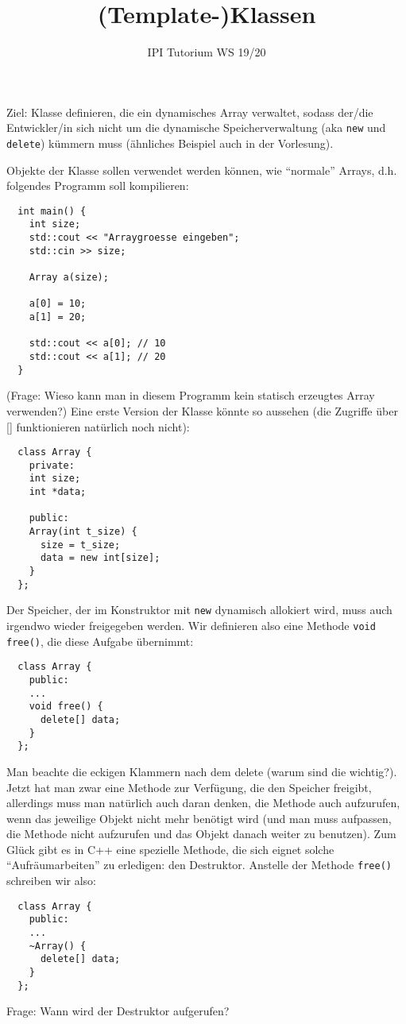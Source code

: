 \documentclass[
fontsize = 11pt,
paper    = a4,
BCOR     = 5mm,
DIV      = 12,
numbers  = noenddot,
]{scrartcl}
\title{(Template-)Klassen}
\author{IPI Tutorium WS 19/20}
\date{}
\def\MMS{\marginpar{%
    \vspace{-1.5em}%
    \begin{mdframed}[style=mms]%
~~???%
\end{mdframed}}}
\begin{document}
\maketitle
Ziel: Klasse definieren, die ein dynamisches Array verwaltet, sodass
der/die Entwickler/in sich nicht um die dynamische Speicherverwaltung
(aka \lstinline{new} und \lstinline{delete}) kümmern muss (ähnliches
Beispiel auch in der Vorlesung).

Objekte der Klasse sollen verwendet werden können, wie ``normale''
Arrays, d.h. folgendes Programm soll kompilieren:
\begin{lstlisting}
  int main() {
    int size;
    std::cout << "Arraygroesse eingeben";
    std::cin >> size;
  
    Array a(size);

    a[0] = 10;
    a[1] = 20;

    std::cout << a[0]; // 10
    std::cout << a[1]; // 20
  }
\end{lstlisting}
(Frage: Wieso kann man in diesem Programm kein statisch erzeugtes
Array verwenden?\MMS) Eine erste Version der Klasse könnte so aussehen
(die Zugriffe über [] funktionieren natürlich noch nicht):
\begin{lstlisting}
  class Array {
    private:
    int size;
    int *data;

    public:
    Array(int t_size) {
      size = t_size;
      data = new int[size];
    }
  };
\end{lstlisting}
Der Speicher, der im Konstruktor mit \lstinline{new} dynamisch
allokiert wird, muss auch irgendwo wieder freigegeben werden.  Wir
definieren also eine Methode \lstinline{void free()}, die diese
Aufgabe übernimmt:
\begin{lstlisting}
  class Array {
    public:
    ...
    void free() {
      delete[] data;
    }
  };
\end{lstlisting}
Man beachte die eckigen Klammern nach dem delete (warum sind die
wichtig?). Jetzt hat man zwar eine Methode zur Verfügung, die den
Speicher freigibt, allerdings muss man natürlich auch daran denken,
die Methode auch aufzurufen, wenn das jeweilige Objekt nicht mehr
benötigt wird (und man muss aufpassen, die Methode nicht aufzurufen
und das Objekt danach weiter zu benutzen). Zum Glück gibt es in C++
eine spezielle Methode, die sich eignet solche ``Aufräumarbeiten'' zu
erledigen: den Destruktor. Anstelle der Methode \lstinline{free()}
schreiben wir also:
\begin{lstlisting}
  class Array {
    public:
    ...
    ~Array() {
      delete[] data;
    }
  };
\end{lstlisting}
Frage: Wann wird der Destruktor aufgerufen?\MMS
\end{document}
